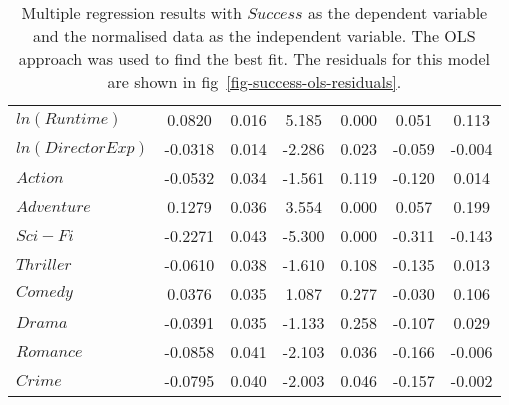 \begin{table}[H]
\begin{center}
\begin{tabular}{lcccccc}
                    \textbf{$ln(Runtime)$}          & 0.0820        & 0.016            & 5.185      & 0.000               & 0.051           & 0.113           \\
                    \textbf{$ln(Director Exp)$}     & -0.0318       & 0.014            & -2.286     & 0.023               & -0.059          & -0.004          \\
                    \textbf{$Action$}               & -0.0532       & 0.034            & -1.561     & 0.119               & -0.120          & 0.014           \\
                    \textbf{$Adventure$}            & 0.1279        & 0.036            & 3.554      & 0.000               & 0.057           & 0.199           \\
                    \textbf{$Sci-Fi$}               & -0.2271       & 0.043            & -5.300     & 0.000               & -0.311          & -0.143          \\
                    \textbf{$Thriller$}             & -0.0610       & 0.038            & -1.610     & 0.108               & -0.135          & 0.013           \\
                    \textbf{$Comedy$}               & 0.0376        & 0.035            & 1.087      & 0.277               & -0.030          & 0.106           \\
                    \textbf{$Drama$}                & -0.0391       & 0.035            & -1.133     & 0.258               & -0.107          & 0.029           \\
                    \textbf{$Romance$}              & -0.0858       & 0.041            & -2.103     & 0.036               & -0.166          & -0.006          \\
                    \textbf{$Crime$}                & -0.0795       & 0.040            & -2.003     & 0.046               & -0.157          & -0.002          \\
                    \bottomrule
                \end{tabular}
            \end{center}
            \caption[short]{Multiple regression results with $Success$ as the dependent variable
                and the normalised data as the independent variable.
                The OLS approach was used to find the best fit.
                The residuals for this model are shown in fig~\ref{fig-success-ols-residuals}.
            }\label{tab-success-ols-summary}
        \end{table}

